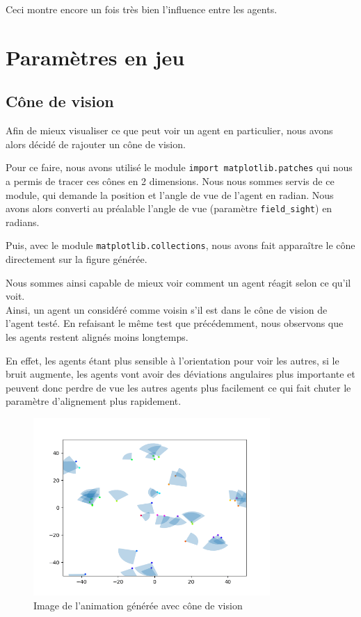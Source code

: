 \documentclass[french, a4paper, 12pt, openany]{report}
\begin{document}
	Ceci montre encore un fois très bien l'influence entre les agents.
\newpage
\section{Paramètres en jeu}
	\subsection{Cône de vision}
	
		Afin de mieux visualiser ce que peut voir un agent en particulier, nous avons alors décidé de rajouter un cône de vision.
     
      Pour ce faire, nous avons utilisé le module \verb|import matplotlib.patches| qui nous a permis de tracer ces cônes en 2 dimensions. Nous nous sommes servis de ce module, qui demande la position et l'angle de vue de l'agent en radian. Nous avons alors converti au préalable l'angle de vue (paramètre \verb|field_sight|) en radians.
      
      Puis, avec le module \verb|matplotlib.collections|, nous avons fait apparaître le cône directement sur la figure générée.
		
		Nous sommes ainsi capable de mieux voir comment un agent réagit selon ce qu'il voit. \\
		
		Ainsi, un agent un considéré comme voisin s'il est dans le cône de vision de l'agent testé. En refaisant le même test que précédemment, nous observons que les agents restent alignés moins longtemps.
		
		En effet, les agents étant plus sensible à l'orientation pour voir les autres, si le bruit augmente, les agents vont avoir des déviations angulaires plus importante et peuvent donc perdre de vue les autres agents plus facilement ce qui fait chuter le paramètre d'alignement plus rapidement.
	
   \begin{figure}[!h]
		\centering
		\includegraphics[width=9cm]{images/image_12.png}
		\caption{Image de l'animation générée avec cône de vision}
		\label{cone_vision}
	\end{figure}  
	
\end{document}
